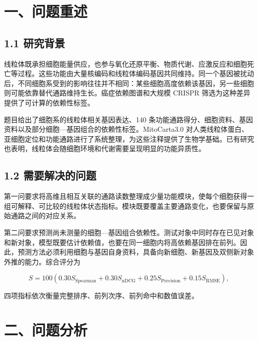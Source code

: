 \hypertarget{ux4e00ux95eeux9898ux91cdux8ff0}{%
\section{一、问题重述}\label{ux4e00ux95eeux9898ux91cdux8ff0}}

\hypertarget{11-ux7814ux7a76ux80ccux666f}{%
\subsection{1.1 研究背景}\label{11-ux7814ux7a76ux80ccux666f}}

线粒体既承担细胞能量供应，也参与氧化还原平衡、物质代谢、应激反应和细胞死亡等过程\cite{ref1}。这些功能由大量核编码和线粒体编码基因共同维持。同一个基因被扰动后，不同细胞系受到的影响往往并不相同：某些细胞高度依赖该基因，另一些细胞则可能依靠替代通路维持生长。癌症依赖图谱和大规模 CRISPR 筛选为这种差异提供了可计算的依赖性标签\cite{ref2,ref3}。

题目给出了细胞系的线粒体相关基因表达、140 条功能通路得分、细胞资料、基因资料以及部分细胞---基因组合的依赖性标签。MitoCarta3.0 对人类线粒体蛋白、亚细胞定位和功能通路进行了系统整理\cite{ref4}，为这些注释提供了生物学基础。已有研究也表明，线粒体会随细胞环境和代谢需要呈现明显的功能异质性\cite{ref5}。

\hypertarget{12-ux9700ux8981ux89e3ux51b3ux7684ux95eeux9898}{%
\subsection{1.2 需要解决的问题}\label{12-ux9700ux8981ux89e3ux51b3ux7684ux95eeux9898}}

第一问要求将高维且相互关联的通路读数整理成少量功能模块，使每个细胞获得一组可解释、可比较的线粒体状态指标。模块既要覆盖主要通路变化，也要保留与原始通路之间的对应关系。

第二问要求预测尚未测量的细胞---基因组合依赖性。测试对象中同时存在已见对象和新对象，模型既要估计依赖值，也要在同一细胞内将高依赖基因排在前列。因此，预测方法必须利用细胞与基因自身资料，具备向新细胞、新基因及双侧新对象外推的能力。综合评分为

\begin{equation}
\label{eq:official-score}
S=100\left(0.30S_{\mathrm{Spearman}}+0.30S_{\mathrm{nDCG}}
+0.25S_{\mathrm{Precision}}+0.15S_{\mathrm{RMSE}}\right),
\end{equation}

四项指标依次衡量完整排序、前列次序、前列命中和数值误差。

\hypertarget{ux4e8cux95eeux9898ux5206ux6790}{%
\section{二、问题分析}\label{ux4e8cux95eeux9898ux5206ux6790}}

